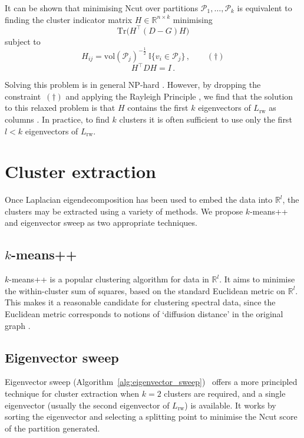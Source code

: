\documentclass[12pt,draft]{ociamthesis}
\theoremstyle{plain}
\theoremstyle{definition}
\theoremstyle{remark}
\newcommand\bb[1]{\mathbb{#1}}
\newcommand\ca[1]{\mathcal{#1}}
\begin{document}
It can be shown \cite{von2007tutorial} that minimising Ncut over partitions
$ \ca{P}_1, \ldots, \ca{P}_k $ is equivalent to finding the cluster indicator
matrix $H \in \bb{R}^{n \times k}$ minimising
$$ \mathrm{Tr} \big( H^\top (D-G) H \big) $$
subject to
$$ H_{i j} = \mathrm{vol}(\ca{P}_j)^{-\frac{1}{2}} \ \bb{I} \{ v_i \in \ca{P}_j
\}\,, \qquad (\dagger) $$
$$ H^\top D H = I\,. $$

Solving this problem is in general \textsf{NP}-hard \cite{wagner1993between}.
However, by dropping the constraint~$(\dagger)$ and applying the Rayleigh
Principle \cite{lutkepohl1996handbook}, we find that the solution to this
relaxed problem is that $H$ contains the first $k$ eigenvectors of
$L_\mathrm{rw}$ as columns \cite{von2007tutorial}.
In practice, to find $k$ clusters it is often sufficient to use only the first
$l < k$ eigenvectors of $L_\mathrm{rw}$.

\section{Cluster extraction} \label{sec:spectral_cluster_extraction}

Once Laplacian eigendecomposition has been used to embed the data into
$\bb{R}^l$, the clusters may be extracted using a variety of methods. We
propose $k$-means++ and eigenvector sweep as two appropriate techniques.

\subsection{\texorpdfstring{$k$}{k}-means++}

$k$-means++ \cite{arthur2007k} is a popular clustering algorithm for data in
$\bb{R}^l$.
It aims to minimise the within-cluster sum of squares, based on the standard
Euclidean metric on $\bb{R}^l$.
This makes it a reasonable candidate for clustering spectral data, since the
Euclidean metric corresponds to notions of `diffusion distance' in the original
graph \cite{nadler2006diffusion}.

\subsection{Eigenvector sweep} \label{sec:spectral_sweep}

Eigenvector sweep
(Algorithm~\ref{alg:eigenvector_sweep})~\cite{shi2000normalized} offers a more
principled technique for cluster extraction when $k=2$ clusters are required,
and a single eigenvector (usually the second eigenvector of $L_\mathrm{rw}$) is
available. It works by sorting the eigenvector and selecting a splitting point
to minimise the Ncut score of the partition generated.
\end{document}
